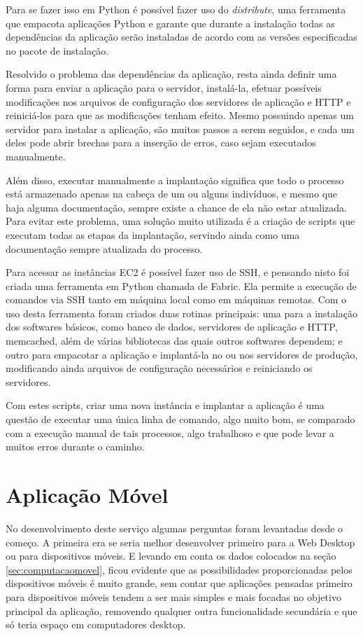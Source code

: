 \documentclass[diss]{template/setrem}
\begin{document}
Para se fazer isso em Python é possível fazer uso do \emph{distribute}, uma ferramenta que empacota aplicações Python e garante que durante a instalação todas as dependências da aplicação serão instaladas de acordo com as versões especificadas no pacote de instalação.

Resolvido o problema das dependências da aplicação, resta ainda definir uma forma para enviar a aplicação para o servidor, instalá-la, efetuar possíveis modificações nos arquivos de configuração dos servidores de aplicação e HTTP e reiniciá-los para que as modificações tenham efeito. Mesmo possuindo apenas um servidor para instalar a aplicação, são muitos passos a serem seguidos, e cada um deles pode abrir brechas para a inserção de erros, caso sejam executados manualmente.

Além disso, executar manualmente a implantação significa que todo o processo está armazenado apenas na cabeça de um ou alguns indivíduos, e mesmo que haja alguma documentação, sempre existe a chance de ela não estar atualizada. Para evitar este problema, uma solução muito utilizada é a criação de scripts que executam todas as etapas da implantação, servindo ainda como uma documentação sempre atualizada do processo.

Para acessar as instâncias EC2 é possível fazer uso de SSH, e pensando nisto foi criada uma ferramenta em Python chamada de Fabric. Ela permite a execução de comandos via SSH tanto em máquina local como em máquinas remotas. Com o uso desta ferramenta foram criados duas rotinas principais: uma para a instalação dos softwares básicos, como banco de dados, servidores de aplicação e HTTP, memcached, além de várias bibliotecas das quais outros softwares dependem; e outro para empacotar a aplicação e implantá-la no ou nos servidores de produção, modificando ainda arquivos de configuração necessários e reiniciando os servidores.

Com estes scripts, criar uma nova instância e implantar a aplicação é uma questão de executar uma única linha de comando, algo muito bom, se comparado com a execução manual de tais processos, algo trabalhoso e que pode levar a muitos erros durante o caminho.

\section{Aplicação Móvel}
No desenvolvimento deste serviço algumas perguntas foram levantadas desde o começo. A primeira era se seria melhor desenvolver primeiro para a Web Desktop ou para dispositivos móveis. E levando em conta os dados colocados na seção \ref{sec:computacaomovel}, ficou evidente que as possibilidades proporcionadas pelos dispositivos móveis é muito grande, sem contar que aplicações pensadas primeiro para dispositivos móveis tendem a ser mais simples e mais focadas no objetivo principal da aplicação, removendo qualquer outra funcionalidade secundária e que só teria espaço em computadores desktop.
\end{document}
